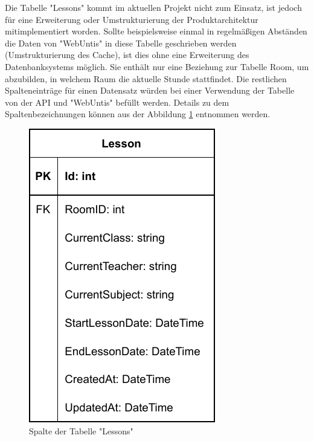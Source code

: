 \pagebreak


Die Tabelle "Lessons" kommt im aktuellen Projekt nicht zum Einsatz, ist jedoch für eine Erweiterung oder Umstrukturierung der Produktarchitektur mitimplementiert worden. Sollte beispielsweise einmal in regelmäßigen Abständen die Daten von "WebUntis" in diese Tabelle geschrieben werden (Umstrukturierung des Cache), ist dies ohne eine Erweiterung des Datenbanksystems möglich. Sie enthält nur eine Beziehung zur Tabelle Room, um abzubilden, in welchem Raum die aktuelle Stunde stattfindet. Die restlichen Spalteneinträge für einen Datensatz würden bei einer Verwendung der Tabelle von der API und "WebUntis" befüllt werden. Details zu dem Spaltenbezeichnungen können aus der Abbildung \ref{fig:LessonColls} entnommen werden.

\begin{figure}[H]
    \centering
    \includegraphics{media/MariaDB/Lesson.svg.pdf}
    \caption{Spalte der Tabelle "Lessons"}
    \label{fig:LessonColls}
\end{figure}
